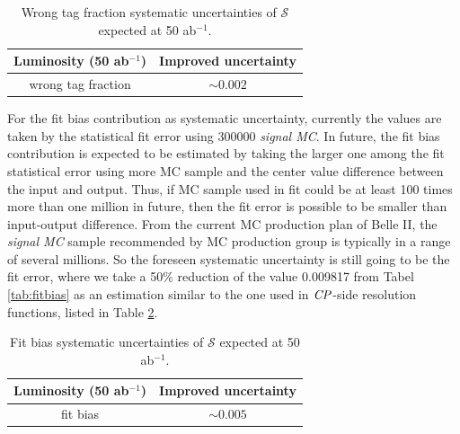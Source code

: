 \begin{table}[htpb]
	\centering
	\caption{ Wrong tag fraction systematic uncertainties of $\mathcal{S}$ expected at 50 ab$^{-1}$.}
	\label{tab:wtag_50ab}
	\begin{tabular}{c| c}
		\hline
		Luminosity (50 ab$^{-1}$) & Improved uncertainty \\
		\hline
		wrong tag fraction &  $\sim0.002$\\
		\hline
	\end{tabular}
\end{table}

For the fit bias contribution as systematic uncertainty, currently the values are taken by the statistical fit error using 300000 \textit{signal MC}. In future, the fit bias contribution is expected to be estimated by taking the larger one among the fit statistical error using more MC sample and the center value difference between the input and output. Thus, if MC sample used in fit could be at least 100 times more than one million in future, then the fit error is possible to be smaller than input-output difference. From the current MC production plan of Belle II, the  \textit{signal MC} sample recommended by MC production group is typically in a range of several millions. So the foreseen systematic uncertainty is still going to be the fit error, where we take a 50\% reduction of the value 0.009817 from Tabel \ref{tab:fitbias} as an estimation similar to the one used in $\it{CP}$-side resolution functions, listed in Table \ref{tab:fitbias_full}.

\begin{table}[htpb]
	\centering
	\caption{ Fit bias systematic uncertainties of $\mathcal{S}$ expected at 50 ab$^{-1}$.}
	\label{tab:fitbias_full}
	\begin{tabular}{c| c}
		\hline
		Luminosity (50 ab$^{-1}$) & Improved uncertainty \\
		\hline
		fit bias &  $\sim 0.005$ \\
		\hline
	\end{tabular}
\end{table}

